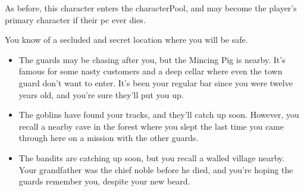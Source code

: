 \begin{multicols}{2}
As before, this character enters the \gls{characterPool}, and may become the player's primary character if their \gls{pc} ever dies.

You know of a secluded and secret location where you will be safe.

\begin{itemize}
  \item
  The guards may be chasing after you, but the Mincing Pig is nearby.  It's famous for some nasty customers and a deep cellar where even the town guard don't want to enter.
  It's been your regular bar since you were twelve years old, and you're sure they'll put you up.
  \item
  The goblins have found your tracks, and they'll catch up soon.
  However, you recall a nearby cave in the forest where you slept the last time you came through here on a mission with the other guards.
  \item
  The bandits are catching up soon, but you recall a walled village nearby.
  Your grandfather was the chief noble before he died, and you're hoping the guards remember you, despite your new beard.
\end{itemize}

\end{multicols}
